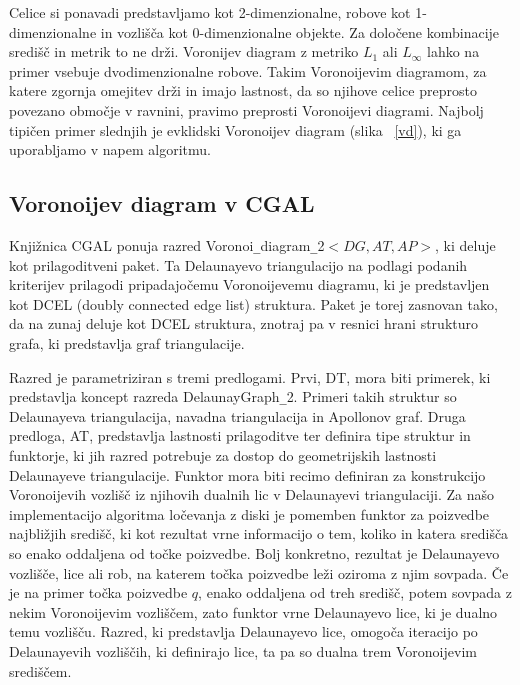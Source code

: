 \documentclass[a4paper, 12pt]{book}
\begin{document}
Celice si ponavadi predstavljamo kot 2-dimenzionalne, robove kot 1-dimenzionalne in vozlišča kot 0-dimenzionalne objekte. Za določene kombinacije središč in metrik to ne drži. Voronijev diagram z metriko $L_1$ ali $L_{\infty}$ lahko na primer vsebuje dvodimenzionalne robove. Takim Voronoijevim diagramom, za katere zgornja omejitev drži in imajo lastnost, da so njihove celice preprosto povezano območje v ravnini, pravimo preprosti Voronoijevi diagrami. Najbolj tipičen primer slednjih je evklidski Voronoijev diagram (slika ~\ref{vd}), ki ga uporabljamo v napem algoritmu.

\subsection{Voronoijev diagram v CGAL}
Knjižnica CGAL ponuja razred Voronoi\texttt{\_}diagram\texttt{\_}2$<DG,AT,AP>$, ki deluje kot prilagoditveni paket. Ta Delaunayevo triangulacijo na podlagi podanih kriterijev prilagodi pripadajočemu Voronoijevemu diagramu, ki je predstavljen kot DCEL (doubly connected edge list) struktura. Paket je torej zasnovan tako, da na zunaj deluje kot DCEL struktura, znotraj pa v resnici hrani strukturo grafa, ki predstavlja graf triangulacije.

Razred je parametriziran s tremi predlogami. Prvi, DT, mora biti primerek, ki predstavlja koncept razreda DelaunayGraph\texttt{\_}2. Primeri takih struktur so Delaunayeva triangulacija, navadna triangulacija in Apollonov graf. Druga predloga, AT, predstavlja lastnosti prilagoditve ter definira tipe struktur in funktorje, ki jih razred potrebuje za dostop do geometrijskih lastnosti Delaunayeve triangulacije. Funktor mora biti recimo definiran za konstrukcijo Voronoijevih vozlišč iz njihovih dualnih lic v Delaunayevi triangulaciji. Za našo implementacijo algoritma ločevanja z diski je pomemben funktor za poizvedbe najbližjih središč, ki kot rezultat vrne informacijo o tem, koliko in katera središča so enako oddaljena od točke poizvedbe. Bolj konkretno, rezultat je Delaunayevo vozlišče, lice ali rob, na katerem točka poizvedbe leži oziroma z njim sovpada. Če je na primer točka poizvedbe $q$, enako oddaljena od treh središč, potem sovpada z nekim Voronoijevim vozliščem, zato funktor vrne Delaunayevo lice, ki je dualno temu vozlišču. Razred, ki predstavlja Delaunayevo lice, omogoča iteracijo po Delaunayevih vozliščih, ki definirajo lice, ta pa so dualna trem Voronoijevim središčem.
\end{document}
